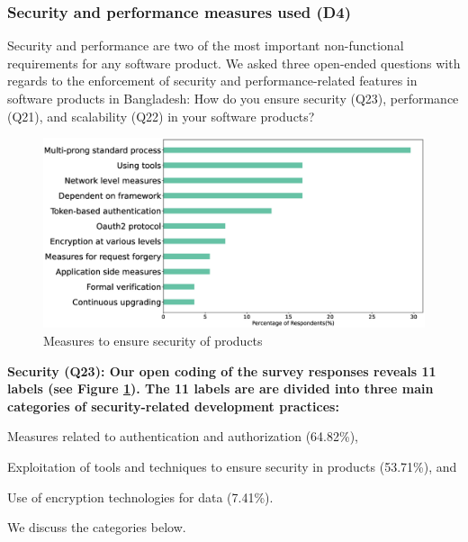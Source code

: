 \subsubsection{Security and performance measures used (D4)}
\label{security_performance}
Security and performance are two of the most important non-functional requirements for any software product. 
We asked three open-ended questions with regards to the enforcement of security and performance-related features in software products in Bangladesh:
How do you ensure security (Q23), performance (Q21), and scalability (Q22) in your software products?




\begin{figure}[h]
\centering
\includegraphics[scale=0.22]{Figures/Security.eps} 
\caption{Measures to ensure security of products}
\label{fig:Measures to ensure security}
\end{figure}
\nd\bf{Security (Q23):} Our open coding of the survey responses reveals 11  
labels (see Figure \ref{fig:Measures to ensure security}). The 11 labels are are divided into three main categories of security-related development practices: 
\begin{inparaenum}
\item Measures related to authentication and authorization (64.82\%),
\item Exploitation of tools and techniques to ensure security in products (53.71\%), and 
\item Use of encryption technologies for data (7.41\%).
\end{inparaenum} We discuss the categories below.  


